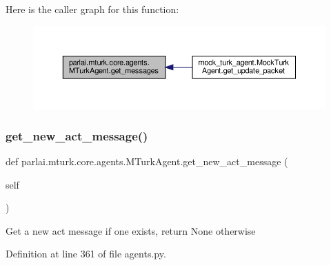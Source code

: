 Here is the caller graph for this function\+:
\nopagebreak
\begin{figure}[H]
\begin{center}
\leavevmode
\includegraphics[width=350pt]{classparlai_1_1mturk_1_1core_1_1agents_1_1MTurkAgent_ae941b277cbfee3e76b543b780ca804f9_icgraph}
\end{center}
\end{figure}
\mbox{\label{classparlai_1_1mturk_1_1core_1_1agents_1_1MTurkAgent_a04758a4244229d4978a92573ec538883}} 
\subsubsection{\texorpdfstring{get\+\_\+new\+\_\+act\+\_\+message()}{get\_new\_act\_message()}}
{\footnotesize\ttfamily def parlai.\+mturk.\+core.\+agents.\+M\+Turk\+Agent.\+get\+\_\+new\+\_\+act\+\_\+message (\begin{DoxyParamCaption}\item[{}]{self }\end{DoxyParamCaption})}

\begin{DoxyVerb}Get a new act message if one exists, return None otherwise\end{DoxyVerb}
 

Definition at line 361 of file agents.\+py.



